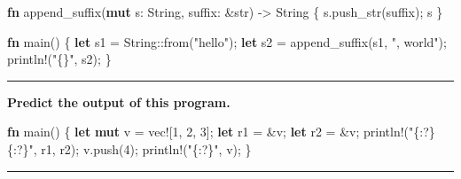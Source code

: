 \documentclass[
  11pt,
]{article}
\newenvironment{Shaded}{}{}
\newcommand{\DataTypeTok}[1]{\textcolor[rgb]{0.56,0.13,0.00}{#1}}
\newcommand{\DecValTok}[1]{\textcolor[rgb]{0.25,0.63,0.44}{#1}}
\newcommand{\KeywordTok}[1]{\textcolor[rgb]{0.00,0.44,0.13}{\textbf{#1}}}
\newcommand{\NormalTok}[1]{#1}
\newcommand{\OperatorTok}[1]{\textcolor[rgb]{0.40,0.40,0.40}{#1}}
\newcommand{\PreprocessorTok}[1]{\textcolor[rgb]{0.74,0.48,0.00}{#1}}
\newcommand{\StringTok}[1]{\textcolor[rgb]{0.25,0.44,0.63}{#1}}
\begin{document}
\begin{Shaded}
\begin{Highlighting}[]
\KeywordTok{fn}\NormalTok{ append\_suffix(}\KeywordTok{mut}\NormalTok{ s}\OperatorTok{:} \DataTypeTok{String}\OperatorTok{,}\NormalTok{ suffix}\OperatorTok{:} \OperatorTok{\&}\DataTypeTok{str}\NormalTok{) }\OperatorTok{{-}\textgreater{}} \DataTypeTok{String} \OperatorTok{\{}
\NormalTok{    s}\OperatorTok{.}\NormalTok{push\_str(suffix)}\OperatorTok{;}
\NormalTok{    s}
\OperatorTok{\}}

\KeywordTok{fn}\NormalTok{ main() }\OperatorTok{\{}
    \KeywordTok{let}\NormalTok{ s1 }\OperatorTok{=} \DataTypeTok{String}\PreprocessorTok{::}\NormalTok{from(}\StringTok{"hello"}\NormalTok{)}\OperatorTok{;}
    \KeywordTok{let}\NormalTok{ s2 }\OperatorTok{=}\NormalTok{ append\_suffix(s1}\OperatorTok{,} \StringTok{", world"}\NormalTok{)}\OperatorTok{;}
    \PreprocessorTok{println!}\NormalTok{(}\StringTok{"\{\}"}\OperatorTok{,}\NormalTok{ s2)}\OperatorTok{;}
\OperatorTok{\}}
\end{Highlighting}
\end{Shaded}

\begin{center}\rule{0.5\linewidth}{0.5pt}\end{center}

\textbf{Predict the output of this program.}

\begin{Shaded}
\begin{Highlighting}[]
\KeywordTok{fn}\NormalTok{ main() }\OperatorTok{\{}
    \KeywordTok{let} \KeywordTok{mut}\NormalTok{ v }\OperatorTok{=} \PreprocessorTok{vec!}\NormalTok{[}\DecValTok{1}\OperatorTok{,} \DecValTok{2}\OperatorTok{,} \DecValTok{3}\NormalTok{]}\OperatorTok{;}
    \KeywordTok{let}\NormalTok{ r1 }\OperatorTok{=} \OperatorTok{\&}\NormalTok{v}\OperatorTok{;}
    \KeywordTok{let}\NormalTok{ r2 }\OperatorTok{=} \OperatorTok{\&}\NormalTok{v}\OperatorTok{;}
    \PreprocessorTok{println!}\NormalTok{(}\StringTok{"\{:?\} \{:?\}"}\OperatorTok{,}\NormalTok{ r1}\OperatorTok{,}\NormalTok{ r2)}\OperatorTok{;}
\NormalTok{    v}\OperatorTok{.}\NormalTok{push(}\DecValTok{4}\NormalTok{)}\OperatorTok{;}
    \PreprocessorTok{println!}\NormalTok{(}\StringTok{"\{:?\}"}\OperatorTok{,}\NormalTok{ v)}\OperatorTok{;}
\OperatorTok{\}}
\end{Highlighting}
\end{Shaded}

\begin{center}\rule{0.5\linewidth}{0.5pt}\end{center}
\end{document}
